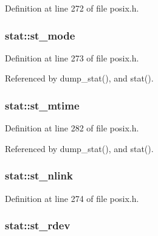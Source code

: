 Definition at line 272 of file posix.\-h.

\hypertarget{structstat_a5cbdd829011af82ba61e83773bbcbc7d}{
\subsubsection[{st\-\_\-mode}]{ stat\-::st\-\_\-mode}}\label{structstat_a5cbdd829011af82ba61e83773bbcbc7d}


Definition at line 273 of file posix.\-h.



Referenced by dump\-\_\-stat(), and stat().

\hypertarget{structstat_a77e235090f8cb6897f1c0ce65689006b}{
\subsubsection[{st\-\_\-mtime}]{ stat\-::st\-\_\-mtime}}\label{structstat_a77e235090f8cb6897f1c0ce65689006b}


Definition at line 282 of file posix.\-h.



Referenced by dump\-\_\-stat(), and stat().

\hypertarget{structstat_a0ed9092fa6c77a3251b9b9a4738ef84f}{
\subsubsection[{st\-\_\-nlink}]{ stat\-::st\-\_\-nlink}}\label{structstat_a0ed9092fa6c77a3251b9b9a4738ef84f}


Definition at line 274 of file posix.\-h.

\hypertarget{structstat_aa61e6c1a8a91c69f1d26f6700a0546cb}{
\subsubsection[{st\-\_\-rdev}]{ stat\-::st\-\_\-rdev}}\label{structstat_aa61e6c1a8a91c69f1d26f6700a0546cb}



